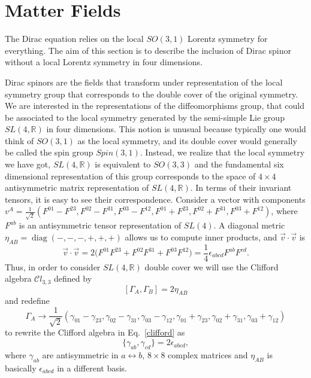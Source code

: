 \documentclass[twocolumn,aps,
  showpacs,showkeys,prd,superscriptaddress]{revtex4-1}
\newcommand{\comm}[2]{\left[#1,#2\right]}
\newcommand*{\diag}{\operatorname{diag}}
\renewcommand{\(}{\left(}
\renewcommand{\)}{\right)}
\renewcommand{\[}{\left[}
\renewcommand{\]}{\right]}
\begin{document}
\section{\label{sec:matter} Matter Fields}

The Dirac equation relies on the local $SO(3,1)$ Lorentz symmetry for everything. The aim of this section is to describe the inclusion of Dirac spinor without a local Lorentz symmetry in four dimensions. 

Dirac spinors are the fields that transform under representation of the local symmetry group that corresponds to the double cover of the original symmetry. We are interested in the representations of the diffeomorphisms group, that could be associated to the local symmetry generated by the semi-simple Lie group $SL(4,\mathbb{R})$ in four dimensions. This notion is unusual because typically one would think of $SO(3,1)$ as the local symmetry, and its double cover would generally be called the spin group $Spin(3,1)$. Instead, we realize that the local symmetry we have got, $SL(4,{\mathbb R})$ is equivalent to $SO(3,3)$ and the fundamental six dimensional representation of this group corresponds to the space of $4\times 4$ antisymmetric matrix representation of $SL(4,{\mathbb R})$. In terms of their invariant tensors, it is easy to see their correspondence. Consider a vector with components 
$v^A=\frac{1}{\sqrt{2}}(F^{01}-F^{23},F^{02}-F^{31},F^{03}-F^{12},F^{01}+F^{23},F^{02}+F^{31},F^{03}+F^{12})$, where $F^{ab}$ is an antisymmetric tensor representation of $SL(4)$. 
A diagonal metric $\eta_{AB} = \diag(-,-,-,+,+,+)$ allows us to compute inner products, and $\vec{v}\cdot\vec{v}$ is 
\begin{dmath}
  \vec{v}\cdot\vec{v} = 2\bigg(F^{01}F^{23}+F^{02}F^{31}+F^{03}F^{12}\bigg)
  =\frac{1}{4}\epsilon_{abcd}F^{ab}F^{cd}.
\end{dmath}
Thus, in order to consider $SL(4,{\mathbb R})$ double cover we will use the Clifford algebra ${\mathcal Cl}_{3,3}$ defined by 
\begin{equation}
  \comm{\Gamma_A}{\Gamma_B} = 2 \eta_{AB}
  \label{clifford}
\end{equation}
and redefine
\begin{dmath}
  \Gamma_A\rightarrow\frac{1}{\sqrt{2}}(\gamma_{01}-\gamma_{23},\gamma_{02}-\gamma_{31},\gamma_{03}-\gamma_{12},\gamma_{01}
  +\gamma_{23},\gamma_{02}+\gamma_{31},\gamma_{03}+\gamma_{12})
\end{dmath} 
to rewrite the Clifford algebra in Eq.~\eqref{clifford} as 
\begin{equation}
  \label{Clifford} 
  \big\{\gamma_{ab},\gamma_{cd}\big\}=2\epsilon_{abcd},
\end{equation}
where $\gamma_{ab}$ are antisymmetric in $a\leftrightarrow b$, $8\times 8$  complex matrices and $\eta_{AB}$ is basically $\epsilon_{abcd} $ in a different basis.
\end{document}
